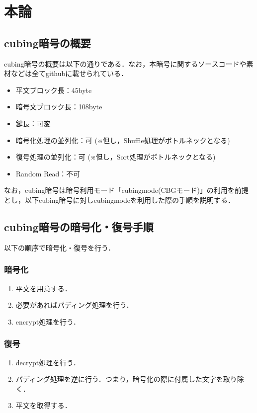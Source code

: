 \documentclass[a4p]{jarticle}
\begin{document}
\section{本論}
\subsection{cubing暗号の概要}
cubing暗号の概要は以下の通りである．なお，本暗号に関するソースコードや素材などは全てgithubに載せられている．\cite{github}

\begin{itemize}
  \item 平文ブロック長：45byte
  \item 暗号文ブロック長：108byte
  \item 鍵長：可変
  \item 暗号化処理の並列化：可 (※但し，Shuffle処理がボトルネックとなる)
  \item 復号処理の並列化：可 (※但し，Sort処理がボトルネックとなる)
  \item Random Read：不可
\end{itemize}
なお，cubing暗号は暗号利用モード「cubingmode(CBGモード)」の利用を前提とし，以下cubing暗号に対しcubingmodeを利用した際の手順を説明する．
\subsection{cubing暗号の暗号化・復号手順}

以下の順序で暗号化・復号を行う．

\subsubsection{暗号化}
\begin{enumerate}
\item 平文を用意する．
\item 必要があればパディング処理を行う．
\item encrypt処理を行う．
\end{enumerate}

\subsubsection{復号}
\begin{enumerate}
\item decrypt処理を行う．
\item パディング処理を逆に行う．つまり，暗号化の際に付属した文字を取り除く．
\item 平文を取得する．
\end{enumerate}
\end{document}
